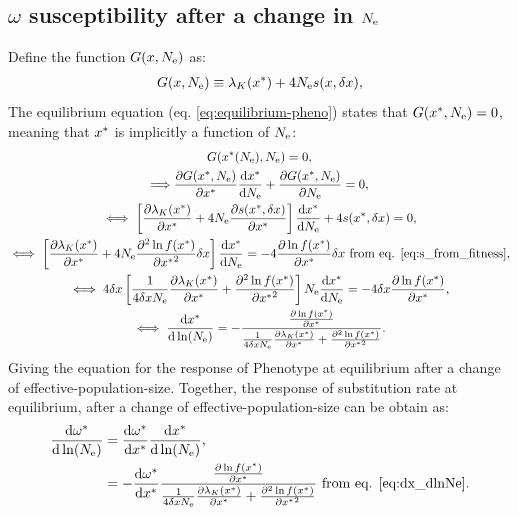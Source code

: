 \subsection{\texorpdfstring{$\omega$}{ω} susceptibility after a change in \texorpdfstring{$N_{\mathrm{e}}$}{Nₑ}}
Define the function $G(x, N_{\mathrm{e}} )$ as:
\begin{gather}
G(x, N_{\mathrm{e}} ) \equiv \lambda_K (x^{*}) + 4 N_{\mathrm{e}} s(x, \delta x), 
\end{gather}
The equilibrium equation (eq. \ref{eq:equilibrium-pheno}) states that $G(x^{*}, N_{\mathrm{e}} )=0$, meaning that $x^{*}$ is implicitly a function of $N_{\mathrm{e}}$:
\begin{gather}
G(x^{*}(N_{\mathrm{e}}), N_{\mathrm{e}} ) = 0, \\
\Longrightarrow \frac{\partial G(x^{*}, N_{\mathrm{e}} ) }{\partial x^{*} }\frac{ \mathrm{d} x^{*}}{\mathrm{d} N_{\mathrm{e}}} + \frac{ \partial G(x^{*}, N_{\mathrm{e}} )}{\partial N_{\mathrm{e}}} = 0, \\
\iff \left[  \frac{\partial \lambda_K (x^{*}) }{\partial x^{*} }  + 4 N_{\mathrm{e}} \frac{ \partial s(x^{*}, \delta x) }{\partial x^{*} } \right]\frac{ \mathrm{d} x^{*}}{\mathrm{d} N_{\mathrm{e}}} + 4 s(x^{*}, \delta x) = 0, \\
\iff \left[  \frac{\partial \lambda_K (x^{*}) }{\partial x^{*} } + 4 N_{\mathrm{e}} \frac{ \partial^2 \ln f(x^{*}) }{\partial {x^{*}}^2}\delta x \right]\frac{ \mathrm{d} x^{*}}{\mathrm{d} N_{\mathrm{e}}}  = - 4 \frac{ \partial \ln f(x^{*}) }{\partial {x^{*}}}\delta x \text{ from eq. \ref{eq:s_from_fitness}}, \\
\iff 4 \delta x \left[ \frac{1}{4 \delta x N_{\mathrm{e}} } \frac{\partial \lambda_K (x^{*}) }{\partial x^{*} } + \frac{ \partial^2 \ln f(x^{*}) }{\partial {x^{*}}^2} \right] N_{\mathrm{e}} \frac{ \mathrm{d} x^{*}}{\mathrm{d} N_{\mathrm{e}}}  = - 4 \delta x \frac{ \partial \ln f(x^{*}) }{\partial {x^{*}}}, \\
\iff \frac{ \mathrm{d} x^{*}}{\mathrm{d} \ln (N_{\mathrm{e}})}  = - \frac{\frac{ \partial \ln f(x^{*}) }{\partial {x^{*}}}}{\frac{1}{4 \delta x N_{\mathrm{e}}} \frac{\partial \lambda_K (x^{*}) }{\partial x^{*} } + \frac{ \partial^2 \ln f(x^{*}) }{\partial {x^{*}}^2}}  \label{eq:dx_dlnNe}.
\end{gather}
Giving the equation for the response of \gls{Phenotype} at equilibrium after a change of \gls{effective-population-size}.
Together, the response of \gls{substitution} rate at equilibrium, after a change of \gls{effective-population-size} can be obtain as:
\begin{align}
\frac{\mathrm{d} \omega^{*}}{\mathrm{d} \ln (N_{\mathrm{e}})} & = \frac{\mathrm{d} \omega^{*}}{\mathrm{d} x^{*}} \frac{ \mathrm{d} x^{*}}{\mathrm{d} \ln (N_{\mathrm{e}})}, \\
 &= - \frac{\mathrm{d} \omega^{*}}{\mathrm{d} x^{*}} \frac{\frac{ \partial \ln f(x^{*}) }{\partial {x^{*}}}}{\frac{1}{4 \delta x N_{\mathrm{e}} } \frac{\partial \lambda_K (x^{*}) }{\partial x^{*} } + \frac{ \partial^2 \ln f(x^{*}) }{\partial {x^{*}}^2}} \text{ from eq. \ref{eq:dx_dlnNe}} \label{eq:dw_dlnNe}.
\end{align}

